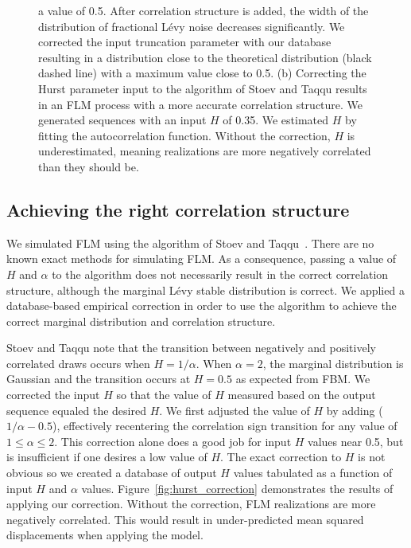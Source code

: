 \documentclass{article}
\begin{document}
\begin{figure}
{  a value of 0.5. After correlation structure is added, the width of the distribution 
  of fractional L\'evy noise decreases significantly. We corrected the input truncation
  parameter with our database resulting in a distribution close to the theoretical
  distribution (black dashed line) with a maximum value close to 0.5.
  (b) Correcting the Hurst parameter input to the algorithm of Stoev and Taqqu
  results in an FLM process with a more accurate correlation structure. We generated
  sequences with an input $H$ of 0.35. We estimated $H$ by fitting the autocorrelation
  function. Without the correction, $H$ is underestimated, meaning realizations are 
  more negatively correlated than they should be. }
  \end{figure}
  
  \subsection{Achieving the right correlation structure}\label{section:flm_correlation}
  
  We simulated FLM using the algorithm of Stoev and Taqqu~\cite{stoev_simulation_2004}.
  There are no known exact methods for simulating FLM. As a consequence, passing a
  value of $H$ and $\alpha$ to the algorithm does not necessarily result in the correct
  correlation structure, although the marginal L\'evy stable distribution is correct. 
  We applied a database-based empirical correction in order to use the
  algorithm to achieve the correct marginal distribution and correlation structure.
  
  Stoev and Taqqu note that the transition between negatively and positively correlated
  draws occurs when $H = 1/ \alpha$. When $\alpha=2$, the marginal distribution is 
  Gaussian and the transition occurs at $H=0.5$ as expected from FBM. We corrected 
  the input $H$ so that the value of $H$ measured based on the output sequence equaled
  the desired $H$. We first adjusted the value of $H$ by adding ($1 / \alpha - 0.5$),
  effectively recentering the correlation sign transition for any value of $1 \leq \alpha \leq 2$.
  This correction alone does a good job for input $H$ values near 0.5, but is
  insufficient if one desires a low value of $H$. The exact correction to $H$ is 
  not obvious so we created a database of output $H$ values tabulated as a function
  of input $H$ and $\alpha$ values. Figure~\ref{fig:hurst_correction} demonstrates the
  results of applying our correction. Without the correction, FLM realizations are
  more negatively correlated. This would result in under-predicted mean squared
  displacements when applying the model.
  
\end{document}
